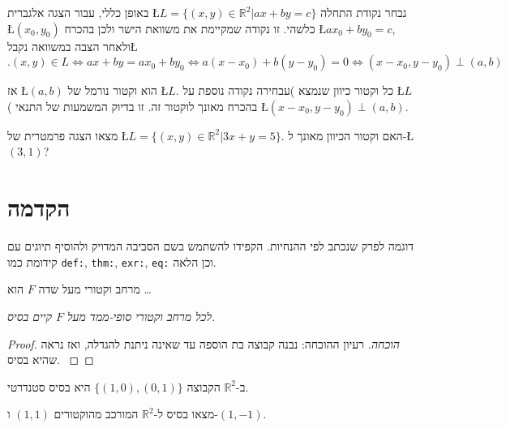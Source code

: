\documentclass[
  hebrew,
  12pt,
  a4paper,
  oneside]{book}
\theoremstyle{definition}
\theoremstyle{remark}
\theoremstyle{plain}
\theoremstyle{remark}
\begin{document}
באופן כללי, עבור הצגה אלגברית Ł\(L=\{(x,y)\in\mathbb{R}^{2}|ax+by=c\}\)
נבחר נקודת התחלה Ł\((x_{0},y_{0})\) כלשהי. זו נקודה שמקיימת את משוואת
הישר ולכן בהכרח Ł\(ax_{0}+by_{0}=c\), ולאחר הצבה במשוואה נקבלŁ
\[.(x,y)\in L\iff ax+by=ax_{0}+by_{0}\iff a(x-x_{0})+b(y-y_{0})=0\iff(x-x_{0},y-y_{0})\perp(a,b)\]

אז Ł\((a,b)\) הוא וקטור נורמל של Ł\(L\). כל וקטור כיוון שנמצא
)ע בחירה נקודה נוספת על Ł\(L\)( בהכרח מאונך לוקטור זה. זו
בדיוק המשמעות של התנאי Ł\((x-x_{0},y-y_{0})\perp(a,b)\).

\begin{exercise}

מצאו הצגה פרמטרית של Ł\(L=\{(x,y)\in\mathbb{R}^{2}|3x+y=5\}\). האם וקטור
הכיוון מאונך ל-Ł\((3,1)\)?

\end{exercise}

\section{הקדמה}\label{ux5d4ux5e7ux5d3ux5deux5d4-1}

דוגמה לפרק שנכתב לפי ההנחיות. הקפידו להשתמש בשם הסביבה המדויק ולהוסיף
תיוגים עם קידומת כמו \texttt{def:}, \texttt{thm:}, \texttt{exr:},
\texttt{eq:} וכן הלאה.

\begin{definition}

\label{def:vectorspace} מרחב וקטורי מעל שדה \(F\) הוא \ldots{}

\end{definition}

\begin{theorem}

\emph{\label{thm:basis-exists} לכל מרחב וקטורי סופי-ממד מעל \(F\) קיים
בסיס.}

\end{theorem}

\begin{proof}
\emph{הוכחה.} רעיון ההוכחה: נבנה קבוצה בת הוספה עד שאינה ניתנת להגדלה,
ואז נראה שהיא בסיס. \qedhere~◻
\end{proof}

\begin{example}

\label{ex:first} ב-\(\mathbb{R}^2\) הקבוצה \(\{(1,0),(0,1)\}\) היא בסיס
סטנדרטי.

\end{example}

\begin{exercise}

\label{exr:find-basis} מצאו בסיס ל-\(\mathbb{R}^2\) המורכב מהוקטורים
\((1,1)\) ו-\((1,-1)\).

\end{exercise}
\end{document}
